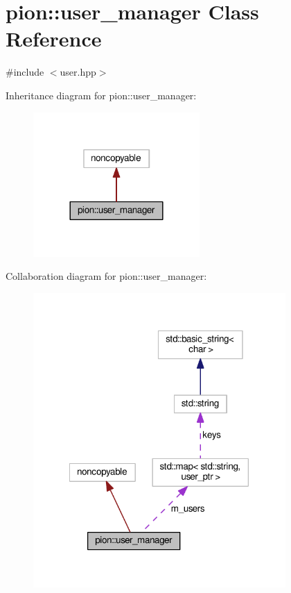 \hypertarget{classpion_1_1user__manager}{\section{pion\-:\-:user\-\_\-manager Class Reference}
\label{classpion_1_1user__manager}
}


{\ttfamily \#include $<$user.\-hpp$>$}



Inheritance diagram for pion\-:\-:user\-\_\-manager\-:
\nopagebreak
\begin{figure}[H]
\begin{center}
\leavevmode
\includegraphics[width=180pt]{classpion_1_1user__manager__inherit__graph}
\end{center}
\end{figure}


Collaboration diagram for pion\-:\-:user\-\_\-manager\-:
\nopagebreak
\begin{figure}[H]
\begin{center}
\leavevmode
\includegraphics[width=273pt]{classpion_1_1user__manager__coll__graph}
\end{center}
\end{figure}
